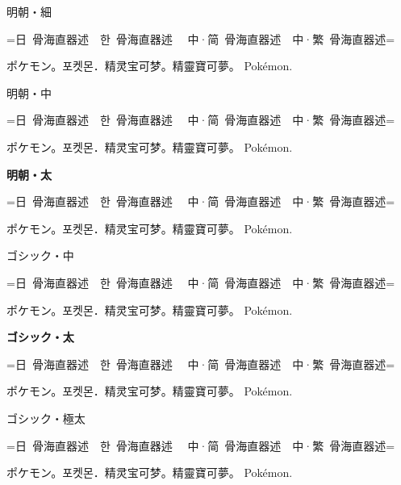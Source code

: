 \documentclass[dvipdfmx,landscape]{utarticle}
\begin{document}
\parindent0mm

{\mcfamily
  {\ltseries
    明朝・細\par
    =日~骨海直器述~~\foreignlanguage{korean}{한~骨海直器述}%
    ~~\foreignlanguage{schinese}{中·简~骨海直器述}~~\foreignlanguage{tchinese}{中·繁~骨海直器述}=\par
    ポケモン。\foreignlanguage{korean}{포켓몬．}\foreignlanguage{schinese}{精灵宝可梦。}\foreignlanguage{tchinese}{精靈寶可夢。} Pokémon.
    \par}
  {\mdseries
    明朝・中\par
    =日~骨海直器述~~\foreignlanguage{korean}{한~骨海直器述}%
    ~~\foreignlanguage{schinese}{中·简~骨海直器述}~~\foreignlanguage{tchinese}{中·繁~骨海直器述}=\par
    ポケモン。\foreignlanguage{korean}{포켓몬．}\foreignlanguage{schinese}{精灵宝可梦。}\foreignlanguage{tchinese}{精靈寶可夢。} Pokémon.
    \par}
  {\bfseries
    明朝・太\par
    =日~骨海直器述~~\foreignlanguage{korean}{한~骨海直器述}%
    ~~\foreignlanguage{schinese}{中·简~骨海直器述}~~\foreignlanguage{tchinese}{中·繁~骨海直器述}=\par
    ポケモン。\foreignlanguage{korean}{포켓몬．}\foreignlanguage{schinese}{精灵宝可梦。}\foreignlanguage{tchinese}{精靈寶可夢。} Pokémon.
    \par}}

{\gtfamily
  {\mdseries
    ゴシック・中\par
    =日~骨海直器述~~\foreignlanguage{korean}{한~骨海直器述}%
    ~~\foreignlanguage{schinese}{中·简~骨海直器述}~~\foreignlanguage{tchinese}{中·繁~骨海直器述}=\par
    ポケモン。\foreignlanguage{korean}{포켓몬．}\foreignlanguage{schinese}{精灵宝可梦。}\foreignlanguage{tchinese}{精靈寶可夢。} Pokémon.
    \par}
  {\bfseries
    ゴシック・太\par
    =日~骨海直器述~~\foreignlanguage{korean}{한~骨海直器述}%
    ~~\foreignlanguage{schinese}{中·简~骨海直器述}~~\foreignlanguage{tchinese}{中·繁~骨海直器述}=\par
    ポケモン。\foreignlanguage{korean}{포켓몬．}\foreignlanguage{schinese}{精灵宝可梦。}\foreignlanguage{tchinese}{精靈寶可夢。} Pokémon.
    \par}
  {\ebseries
    ゴシック・極太\par
    =日~骨海直器述~~\foreignlanguage{korean}{한~骨海直器述}%
    ~~\foreignlanguage{schinese}{中·简~骨海直器述}~~\foreignlanguage{tchinese}{中·繁~骨海直器述}=\par
    ポケモン。\foreignlanguage{korean}{포켓몬．}\foreignlanguage{schinese}{精灵宝可梦。}\foreignlanguage{tchinese}{精靈寶可夢。} Pokémon.
    \par}}
\end{document}
